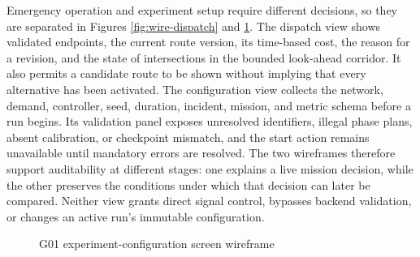 Emergency operation and experiment setup require different decisions, so they are separated in Figures \ref{fig:wire-dispatch} and \ref{fig:wire-config}. The dispatch view shows validated endpoints, the current route version, its time-based cost, the reason for a revision, and the state of intersections in the bounded look-ahead corridor. It also permits a candidate route to be shown without implying that every alternative has been activated. The configuration view collects the network, demand, controller, seed, duration, incident, mission, and metric schema before a run begins. Its validation panel exposes unresolved identifiers, illegal phase plans, absent calibration, or checkpoint mismatch, and the start action remains unavailable until mandatory errors are resolved. The two wireframes therefore support auditability at different stages: one explains a live mission decision, while the other preserves the conditions under which that decision can later be compared. Neither view grants direct signal control, bypasses backend validation, or changes an active run's immutable configuration.

\begin{figure}[htbp]
\centering
{}
\caption{G01 experiment-configuration screen wireframe}
\label{fig:wire-config}
\end{figure}

